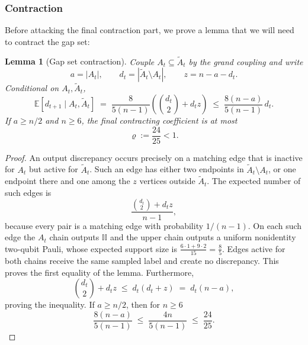 \documentclass[
    aps,
    superscriptaddress,
    onecolumn,
    10pt,
    prx,
    nofootinbib
]{revtex4-2}
\newtheorem{lemma}{Lemma}
\theoremstyle{namedstatement}
\theoremstyle{plain}
\begin{document}
\subsubsection{Contraction}
Before attacking the final contraction part, we prove a lemma that we will need to contract the gap set:
\begin{lemma}[Gap set contraction]\label{lem:discrepancy}
Couple $A_t\subseteq \widetilde{A}_t$ by the grand coupling and write
\begin{equation}
  a=|A_t|,\qquad d_t=|\widetilde{A}_t\setminus A_t|,\qquad z=n-a-d_t.
\end{equation}
Conditional on $A_t,\widetilde{A}_t$,
\begin{equation}\label{eq:contraction}
  \mathbb E[d_{t+1}\mid A_t,\widetilde{A}_t]
  \;=\;\frac{8}{5(n-1)}\left(\binom{d_t}{2}+d_tz\right)
  \;\le\;\frac{8(n-a)}{5(n-1)}\,d_t.
\end{equation}
If $a\ge n/2$ and $n\ge6$, the final contracting coefficient is at most
\begin{equation}\label{eq:rho}
  \varrho:=\frac{24}{25}<1.
\end{equation}
\end{lemma}

\begin{proof}
An output discrepancy occurs precisely on a matching edge that is inactive for $A_t$
but active for $\widetilde{A}_t$. Such an edge has either two endpoints in $\widetilde{A}_t\setminus A_t$, or
one endpoint there and one among the $z$ vertices outside $\widetilde{A}_t$. The expected number of such edges is
\begin{equation}
  \frac{\binom{d_t}{2}+d_tz}{n-1},
\end{equation}
because every pair is a
matching edge with probability $1/(n-1)$. On each such edge the $A_t$ chain outputs $\mathbb I\mathbb I$ and the upper chain
outputs a uniform nonidentity two-qubit Pauli, whose expected support size is $\frac{6\cdot1+9\cdot2}{15}=\frac85$. Edges active for both chains receive the same sampled label and create no
discrepancy. This proves the first equality of the lemma. Furthermore,
\begin{equation}
  \binom{d_t}{2}+d_tz\;\le\;d_t(d_t+z)\;=\;d_t(n-a),
\end{equation}
proving the inequality. If $a\ge n/2$, then for $n\ge6$
\begin{equation}
  \frac{8(n-a)}{5(n-1)}\;\le\;\frac{4n}{5(n-1)}\;\le\;\frac{24}{25}.
\end{equation}
\end{proof}
\end{document}
